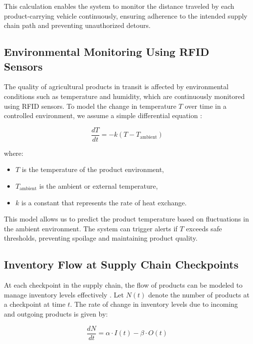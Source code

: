 \documentclass[conference]{IEEEtran}
\begin{document}
This calculation enables the system to monitor the distance traveled by each product-carrying vehicle continuously, ensuring adherence to the intended supply chain path and preventing unauthorized detours.

\subsection{Environmental Monitoring Using RFID Sensors}

The quality of agricultural products in transit is affected by environmental conditions such as temperature and humidity, which are continuously monitored using RFID sensors. To model the change in temperature \( T \) over time in a controlled environment, we assume a simple differential equation \cite{rayhana2021rfid, visconti2020development}:

\begin{equation}
    \frac{dT}{dt} = -k(T - T_{\text{ambient}})
\end{equation}

where:
\begin{itemize}
    \item \( T \) is the temperature of the product environment,
    \item \( T_{\text{ambient}} \) is the ambient or external temperature,
    \item \( k \) is a constant that represents the rate of heat exchange.
\end{itemize}

This model allows us to predict the product temperature based on fluctuations in the ambient environment. The system can trigger alerts if \( T \) exceeds safe thresholds, preventing spoilage and maintaining product quality.

\subsection{Inventory Flow at Supply Chain Checkpoints}

At each checkpoint in the supply chain, the flow of products can be modeled to manage inventory levels effectively \cite{abdullah2020efficiency}. Let \( N(t) \) denote the number of products at a checkpoint at time \( t \). The rate of change in inventory levels due to incoming and outgoing products is given by:

\begin{equation}
    \frac{dN}{dt} = \alpha \cdot I(t) - \beta \cdot O(t)
\end{equation}
\end{document}
